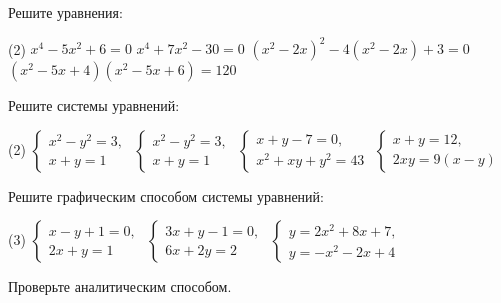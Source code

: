 \begin{exam}
	\begin{listofex}
		\item Решите уравнения:
		\begin{tasks}(2)
			\task \( x^4-5x^2+6=0 \)
			\task \( x^4+7x^2-30=0 \)
			\task \( (x^2-2x)^2-4(x^2-2x)+3=0 \)
			\task \( (x^2-5x+4)(x^2-5x+6)=120 \)
		\end{tasks}
		\item Решите системы уравнений:
		\begin{tasks}(2)
			\task \( \begin{cases} x^2-y^2=3,\\ x+y=1 \end{cases} \)
			\task \( \begin{cases} x^2-y^2=3,\\ x+y=1 \end{cases} \)
			\task \( \begin{cases} x+y-7=0,\\ x^2+xy+y^2=43 \end{cases} \)
			\task \( \begin{cases} x+y=12,\\ 2xy=9(x-y) \end{cases} \)
		\end{tasks}
		\item Решите графическим способом системы уравнений:
		\begin{tasks}(3)
			\task \( \begin{cases} x-y+1=0,\\ 2x+y=1 \end{cases} \)
			\task \( \begin{cases} 3x+y-1=0,\\ 6x+2y=2 \end{cases} \)
			\task \( \begin{cases} y=2x^2+8x+7,\\ y=-x^2-2x+4 \end{cases} \)
		\end{tasks}
		Проверьте аналитическим способом.
	\end{listofex}
\end{exam}


